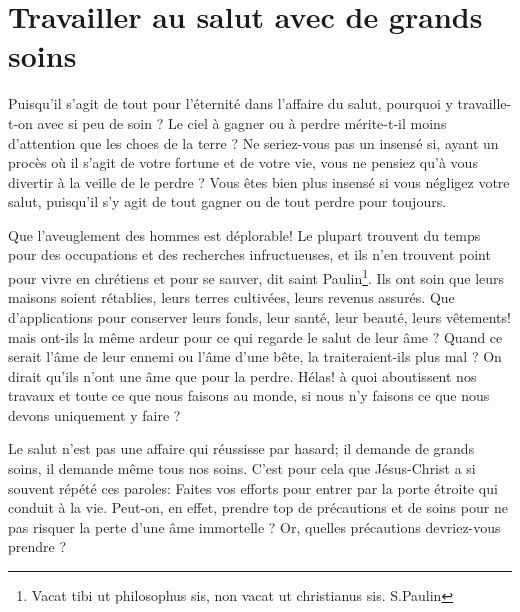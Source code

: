 \documentclass[instructions.tex]{subfiles}
\begin{document}
 
\chapter{Travailler au salut avec de grands soins}
 
\primo Puisqu'il s'agit de tout pour l'éternité dans l'affaire du salut, pourquoi y travaille-t-on avec si peu de soin ? Le ciel à gagner ou à perdre mérite-t-il moins d'attention que les choes de la terre ? Ne seriez-vous pas un insensé si, ayant un procès où il s'agit de votre fortune et de votre vie, vous ne pensiez qu'à vous divertir à la veille de le perdre ? Vous êtes bien plus insensé si vous négligez votre salut, puisqu'il s'y agit de tout gagner ou de tout perdre pour toujours.

Que l'aveuglement des hommes est déplorable! Le plupart trouvent du temps pour des occupations et des recherches infructueuses, et ils n'en trouvent point pour vivre en chrétiens et pour se sauver, dit saint Paulin\footnote{Vacat tibi ut philosophus sis, non vacat ut christianus sis. S.Paulin}. Ils ont soin que leurs maisons soient rétablies, leurs terres cultivées, leurs revenus assurés. Que d'applications pour conserver leurs fonds, leur santé, leur beauté, leurs vêtements! mais ont-ils la même ardeur pour ce qui regarde le salut de leur âme ? Quand ce serait l'âme de leur ennemi ou l'âme d'une bête, la traiteraient-ils plus mal ? On dirait qu'ils n'ont une âme que pour la perdre. Hélas! à quoi aboutissent nos travaux et toute ce que nous faisons au monde, si nous n'y faisons ce que nous devons uniquement y faire ? 

\secundo Le salut n'est pas une affaire qui réussisse par hasard; il demande de grands soins, il demande même tous nos soins. C'est pour cela que Jésus-Christ a si souvent répété ces paroles: \og Faites vos efforts pour entrer par la porte étroite qui conduit à la vie\fg. Peut-on, en effet, prendre top de précautions et de soins pour ne pas risquer la perte d'une âme immortelle ? Or, quelles précautions devriez-vous prendre ? 
\end{document}

